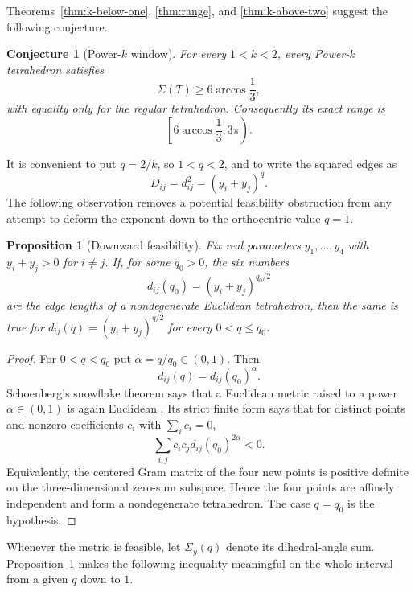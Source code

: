 \documentclass[11pt,a4paper]{article}
\newtheorem{proposition}[theorem]{Proposition}
\newtheorem{conjecture}[theorem]{Conjecture}
\theoremstyle{definition}
\theoremstyle{remark}
\begin{document}
Theorems~\ref{thm:k-below-one}, \ref{thm:range}, and
\ref{thm:k-above-two} suggest the following conjecture.

\begin{conjecture}[Power-$k$ window]\label{conj:power-window}
For every $1<k<2$, every Power-$k$ tetrahedron satisfies
\begin{equation}\label{eq:power-window-bound}
 \Sigma(T)\geq6\arccos\frac13,
\end{equation}
with equality only for the regular tetrahedron.  Consequently its exact
range is
\[
 \left[6\arccos\frac13,3\pi\right).
\]
\end{conjecture}

It is convenient to put $q=2/k$, so $1<q<2$, and to write the squared
edges as
\begin{equation}\label{eq:q-metric}
 D_{ij}=d_{ij}^2=(y_i+y_j)^q.
\end{equation}
The following observation removes a potential feasibility obstruction from
any attempt to deform the exponent down to the orthocentric value $q=1$.

\begin{proposition}[Downward feasibility]\label{prop:snowflake-feasibility}
Fix real parameters $y_1,\ldots,y_4$ with $y_i+y_j>0$ for $i\ne j$.  If,
for some $q_0>0$, the six numbers
\[
 d_{ij}(q_0)=(y_i+y_j)^{q_0/2}
\]
are the edge lengths of a nondegenerate Euclidean tetrahedron, then the same
is true for $d_{ij}(q)=(y_i+y_j)^{q/2}$ for every $0<q\le q_0$.
\end{proposition}

\begin{proof}
For $0<q<q_0$ put $\alpha=q/q_0\in(0,1)$.  Then
\[
 d_{ij}(q)=d_{ij}(q_0)^\alpha.
\]
Schoenberg's snowflake theorem says that a Euclidean metric raised to a
power $\alpha\in(0,1)$ is again Euclidean \cite{Schoenberg1938}.  Its strict
finite form says that for distinct points and nonzero coefficients $c_i$
with $\sum_i c_i=0$,
\[
 \sum_{i,j}c_ic_jd_{ij}(q_0)^{2\alpha}<0.
\]
Equivalently, the centered Gram matrix of the four new points is positive
definite on the three-dimensional zero-sum subspace.  Hence the four points
are affinely independent and form a nondegenerate tetrahedron.  The case
$q=q_0$ is the hypothesis.
\end{proof}

Whenever the metric is feasible, let $\Sigma_y(q)$ denote its dihedral-angle
sum.  Proposition~\ref{prop:snowflake-feasibility} makes the following
inequality meaningful on the whole interval from a given $q$ down to $1$.
\end{document}
